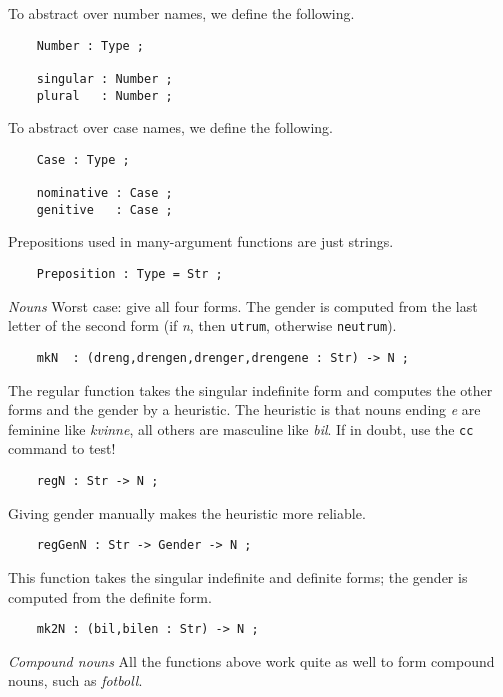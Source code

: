 \documentclass[11pt,a4paper]{article}
\newcommand{\subsubsubsection}[1]{\textit{#1}}
\begin{document}
To abstract over number names, we define the following.

\begin{verbatim}
    Number : Type ; 
  
    singular : Number ;
    plural   : Number ;
\end{verbatim}

To abstract over case names, we define the following.

\begin{verbatim}
    Case : Type ;
  
    nominative : Case ;
    genitive   : Case ;
\end{verbatim}

Prepositions used in many-argument functions are just strings.

\begin{verbatim}
    Preposition : Type = Str ;
\end{verbatim}

\subsubsubsection{Nouns}
Worst case: give all four forms. The gender is computed from the
last letter of the second form (if \textit{n}, then \texttt{utrum}, otherwise \texttt{neutrum}).

\begin{verbatim}
    mkN  : (dreng,drengen,drenger,drengene : Str) -> N ;
\end{verbatim}

The regular function takes the singular indefinite form
and computes the other forms and the gender by a heuristic.
The heuristic is that nouns ending \textit{e} are feminine like \textit{kvinne},
all others are masculine like \textit{bil}. 
If in doubt, use the \texttt{cc} command to test!

\begin{verbatim}
    regN : Str -> N ;
\end{verbatim}

Giving gender manually makes the heuristic more reliable.

\begin{verbatim}
    regGenN : Str -> Gender -> N ;
\end{verbatim}

This function takes the singular indefinite and definite forms; the
gender is computed from the definite form.

\begin{verbatim}
    mk2N : (bil,bilen : Str) -> N ;
\end{verbatim}

\subsubsubsection{Compound nouns}
All the functions above work quite as well to form compound nouns,
such as \textit{fotboll}. 
\end{document}
